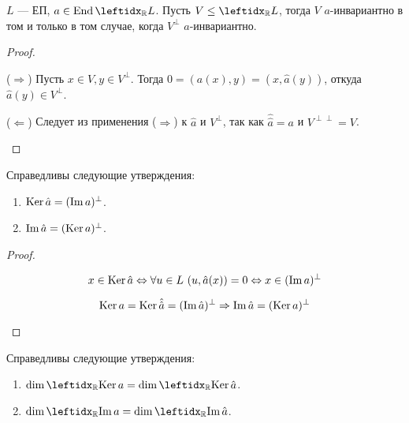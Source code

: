 \begin{cor}
    $L$ --- ЕП, $a \in \End \lsub{\mathbb{R}}{L}$. Пусть $V \le \lsub{\mathbb{R}}{L}$, тогда $V$ $a$-инвариантно в том и только в том случае, когда $V^\perp$ $\hat{a}$-инвариантно.
\end{cor}
\begin{proof}
    \begin{proofpart}{($\Rightarrow$)}
        Пусть $x \in V, y \in V^\perp$. Тогда $0 = (a(x), y) = (x, \hat{a}(y))$, откуда $\hat{a}(y) \in V^\perp$.
    \end{proofpart}

    \begin{proofpart}{($\Leftarrow$)}
        Следует из применения ($\Rightarrow$) к $\hat{a}$ и $V^\perp$, так как $\hat{\hat{a}} = a$ и $V^{\perp\perp} = V$.
    \end{proofpart}
\end{proof}

\begin{cor}
    Справедливы следующие утверждения:
    \begin{enumerate}
        \item $\operatorname{Ker} \hat{a} = (\operatorname{Im} a)^\perp$.
        \item $\operatorname{Im} \hat{a} = (\operatorname{Ker} a)^\perp$.
    \end{enumerate}
\end{cor}

\begin{proof}
    \begin{proofpart}
        $$x \in \operatorname{Ker} \hat{a} \Leftrightarrow \forall u \in L\ (u, \hat{a}(x)) = 0 \Leftrightarrow x \in (\operatorname{Im} a)^\perp$$
    \end{proofpart}

    \begin{proofpart}
        $$\operatorname{Ker} a = \operatorname{Ker} \hat{\hat{a}} = (\operatorname{Im} \hat{a})^\perp \Rightarrow \operatorname{Im} \hat{a} = (\operatorname{Ker} a)^\perp$$
    \end{proofpart}
\end{proof}

\begin{cor}
    Справедливы следующие утверждения:
    \begin{enumerate}
        \item $\dim \lsub{\mathbb{R}}{\ker a} = \dim \lsub{\mathbb{R}}{\ker \hat{a}}$.
        \item $\dim \lsub{\mathbb{R}}{\im a} = \dim \lsub{\mathbb{R}}{\im \hat{a}}$.
    \end{enumerate}
\end{cor}


